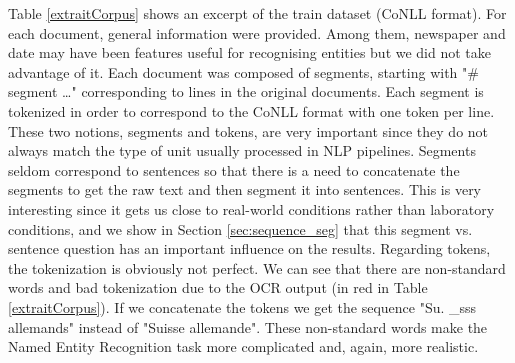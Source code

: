 Table \ref{extraitCorpus} shows an excerpt of the train dataset (CoNLL format).
For each document, general information were provided. Among them, newspaper and date may have been features useful for recognising entities but we did not take advantage of it.
Each document was composed of segments, starting with "\# segment \dots" corresponding to lines in the original documents. Each segment is tokenized in order to correspond to the CoNLL format with one token per line.
These two notions, segments and tokens, are very important since they do not always match the type of unit usually processed in NLP pipelines.
Segments seldom correspond to sentences so that there is a need to concatenate the segments to get the raw text and then segment it into sentences. This is very interesting since it gets us close to real-world conditions rather than laboratory conditions, and we show in Section \ref{sec:sequence_seg} that this segment vs. sentence question has an important influence on the results.
Regarding tokens, the tokenization is obviously not perfect.
We can see that there are non-standard words and bad tokenization due to the OCR output (in red in Table \ref{extraitCorpus}).
If we concatenate the tokens we get the sequence "Su. \_sss allemands" instead of "Suisse allemande". These non-standard words make the Named Entity Recognition task more complicated and, again, more realistic.


